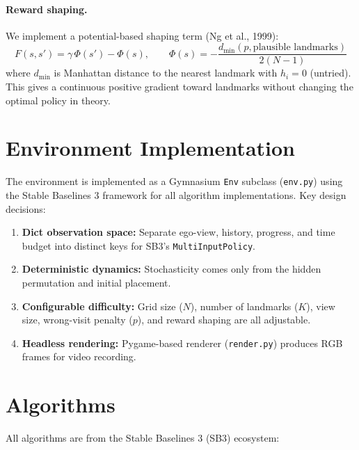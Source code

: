 \documentclass[11pt,a4paper]{article}
\begin{document}
\paragraph{Reward shaping.}
We implement a potential-based shaping term (Ng et al., 1999):
\[
  F(s, s') = \gamma \, \Phi(s') - \Phi(s), \qquad
  \Phi(s) = -\frac{d_{\min}(p, \text{plausible landmarks})}
                   {2(N-1)}
\]
where $d_{\min}$ is Manhattan distance to the nearest landmark with $h_i = 0$ (untried). This gives a continuous positive gradient toward landmarks without changing the optimal policy in theory.

\section{Environment Implementation}

The environment is implemented as a Gymnasium \texttt{Env} subclass
(\texttt{env.py}) using the Stable Baselines 3 framework for all algorithm implementations. Key design decisions:

\begin{enumerate}[nosep]
  \item \textbf{Dict observation space:} Separate ego-view, history,
        progress, and time budget into distinct keys for SB3's
        \texttt{MultiInputPolicy}.
  \item \textbf{Deterministic dynamics:} Stochasticity comes only from the
        hidden permutation and initial placement.
  \item \textbf{Configurable difficulty:} Grid size ($N$), number of landmarks
        ($K$), view size, wrong-visit penalty ($p$), and reward shaping
        are all adjustable.
  \item \textbf{Headless rendering:} Pygame-based renderer (\texttt{render.py})
        produces RGB frames for video recording.
\end{enumerate}

\section{Algorithms}

All algorithms are from the Stable Baselines 3 (SB3) ecosystem:
\end{document}

